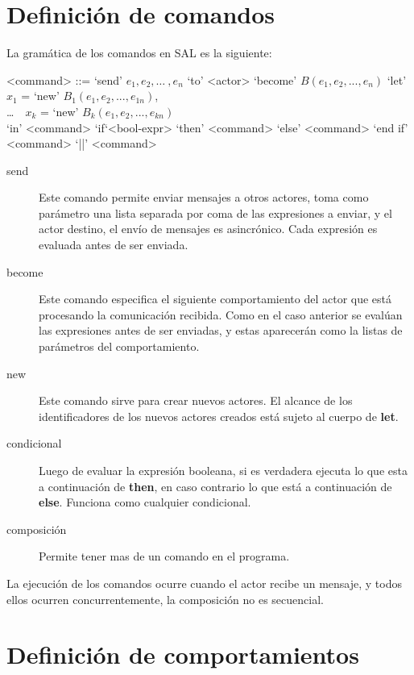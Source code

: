 \section{Definición de comandos}
La gramática de los comandos en SAL es la siguiente:

\begin{grammar}
  <command> ::= `send' $e_1, e_2, \ldots\ , e_n$ `to' <actor>  
  \alt `become' $B(e_1, e_2, ..., e_n)$
  \alt `let' $x_1$ = `new' $B_1(e_1, e_2, ..., e_{1n})$, \\
   \ldots\ \ $x_k$ = `new' $B_k(e_1, e_2, ..., e_{kn})$   \\
  `in' <command> 
  \alt `if`<bool-expr> `then' <command> `else' <command> `end if'
  \alt <command> `||' <command>
\end{grammar}

\begin{description}
\item [send] Este comando permite enviar mensajes a otros actores, toma como
  parámetro una lista separada por coma de las expresiones a enviar, y el actor
  destino, el envío de mensajes es asincrónico. Cada expresión es evaluada antes
  de ser enviada.
\item [become] Este comando especifica el siguiente comportamiento del actor
  que está procesando la comunicación recibida. Como en el caso anterior se evalúan
  las expresiones antes de ser enviadas, y estas aparecerán como la listas de
  parámetros del comportamiento. 
\item[new] Este comando sirve para crear nuevos actores. El alcance de los
  identificadores de los nuevos actores creados está sujeto al cuerpo de \textbf{let}.
\item[condicional] Luego de evaluar la expresión booleana, si es verdadera
  ejecuta lo que esta a continuación de \textbf{then}, en caso contrario lo que está a
  continuación de \textbf{else}. Funciona como cualquier condicional.
\item[composición] Permite tener mas de un comando en el programa.
 
\end{description}

La ejecución de los comandos ocurre cuando el actor recibe un mensaje, y todos
ellos ocurren concurrentemente, la composición no es secuencial.

\section{Definición de comportamientos}

